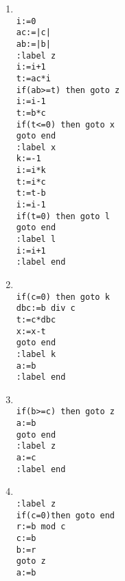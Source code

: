 \documentclass[a4paper,11pt]{article}             %
\begin{document}
\begin{enumerate}
\begin{enumerate}
\item \texttt{\\
i:=0\\
ac:=|c|\\
ab:=|b|\\
:label z\\
i:=i+1\\
t:=ac*i\\
if(ab>=t) then goto z\\
i:=i-1\\
t:=b*c\\
if(t<=0) then goto x\\
goto end\\
:label x\\
k:=-1\\
i:=i*k\\
t:=i*c\\
t:=t-b\\
i:=i-1\\
if(t=0) then goto l\\
goto end\\
:label l\\
i:=i+1\\
:label end
}

\item \texttt{\\
if(c=0) then goto k\\
dbc:=b div c\\
t:=c*dbc\\
x:=x-t\\
goto end\\
:label k\\
a:=b\\
:label end
}

\item \texttt{\\
if(b>=c) then goto z\\
a:=b\\
goto end\\
:label z\\
a:=c\\
:label end
}

\item \texttt{\\
:label z\\
if(c=0)then goto end\\
r:=b mod c\\
c:=b\\
b:=r\\
goto z\\
a:=b\\
}

\end{enumerate}

\end{enumerate}
\end{document}
